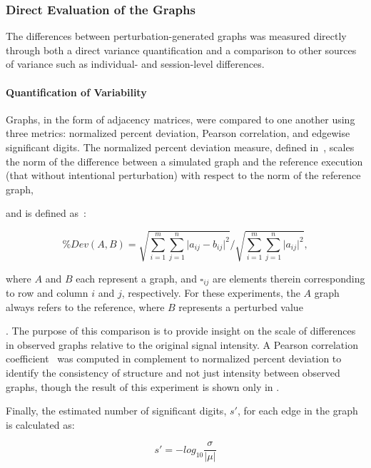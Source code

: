 \documentclass[fleqn,10pt]{SelfArx} %
\newcommand{\new}[1]{{\color{blue} #1}}
\begin{document}
\subsubsection*{Direct Evaluation of the Graphs}

The differences between \new{perturbation-generated} graphs was measured directly through both a direct variance quantification and a
comparison to other sources of variance such as individual- and session-level differences.

\paragraph{Quantification of Variability}
Graphs, in the form of adjacency matrices, were compared to one another using three metrics: normalized percent
deviation, Pearson correlation, and edgewise significant digits. The normalized percent deviation measure, defined
in~\cite{Kiar2020-lb}, scales the norm of the difference between a simulated graph and the reference execution (that
without intentional perturbation) with respect to the norm of the reference graph, \new{and is defined as~\cite{Kiar2020-lb}:

\begin{equation}
\% Dev (A, B) = \sqrt{\sum_{i=1}^m\sum_{j=1}^n \lvert a_{ij} - b_{ij} \rvert^2 } / \sqrt{\sum_{i=1}^m\sum_{j=1}^n \lvert a_{ij} \rvert^2},
\label{eq:eval}
\end{equation}

where $A$ and $B$ each represent a graph, and $\square_{ij}$ are elements therein corresponding to row and column
$i$ and $j$, respectively. For these experiments, the $A$ graph always refers to the reference, where $B$ represents a
perturbed value}. The purpose of this comparison is
to provide insight on the scale of differences in observed graphs relative to the original signal intensity. A Pearson
correlation coefficient~\cite{Benesty2009-cb} was computed in complement to normalized percent deviation to identify
the consistency of structure and not just intensity between observed graphs, \new{though the result of this experiment
is shown only in \sref{supsec:correlation}}.

Finally, the estimated number of significant digits, $s'$, for each edge in the graph is calculated as:

\begin{equation}
s' = -log_{10}\frac{\sigma}{\lvert\mu\rvert}
\label{eq:sigdig}
\end{equation}
\end{document}
